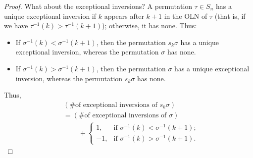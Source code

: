 \begin{proof}
What about the exceptional inversions? A permutation $\tau\in S_{n}$ has a
unique exceptional inversion if $k$ appears after $k+1$ in the OLN of $\tau$
(that is, if we have $\tau^{-1}\left(  k\right)  >\tau^{-1}\left(  k+1\right)
$); otherwise, it has none. Thus:

\begin{itemize}
\item If $\sigma^{-1}\left(  k\right)  <\sigma^{-1}\left(  k+1\right)  $, then
the permutation $s_{k}\sigma$ has a unique exceptional inversion, whereas the
permutation $\sigma$ has none.

\item If $\sigma^{-1}\left(  k\right)  >\sigma^{-1}\left(  k+1\right)  $, then
the permutation $\sigma$ has a unique exceptional inversion, whereas the
permutation $s_{k}\sigma$ has none.
\end{itemize}

Thus,%
\begin{align}
&  \left(  \text{\# of exceptional inversions of }s_{k}\sigma\right)
\nonumber\\
&  =\left(  \text{\# of exceptional inversions of }\sigma\right) \nonumber\\
&  \ \ \ \ \ \ \ \ \ \ +%
\begin{cases}
1, & \text{if }\sigma^{-1}\left(  k\right)  <\sigma^{-1}\left(  k+1\right)
;\\
-1, & \text{if }\sigma^{-1}\left(  k\right)  >\sigma^{-1}\left(  k+1\right)  .
\end{cases}
\label{pf.lem.perm.len.ssl.eq-exc}%
\end{align}



\end{proof}
